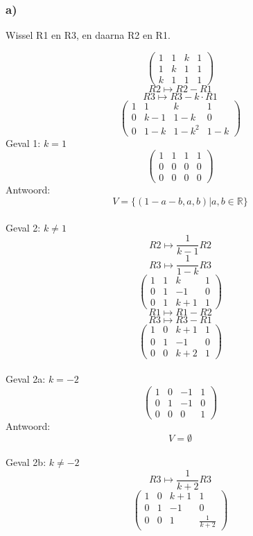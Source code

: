 \documentclass[10pt,a4paper]{article}
\begin{document}
\subsubsection*{a)}
\begin{center}
Wissel R1 en R3, en daarna R2 en R1.
\end{center}
\[
\begin{pmatrix}
1 &  1 &  k & 1\\
1 &  k &  1 & 1\\
k &  1 &  1 & 1
\end{pmatrix}
\]
\[ R2 \longmapsto R2 - R1\]
\[ R3 \longmapsto R3 - k \cdot	R1\]
\[
\begin{pmatrix}
1 &  1 &  k & 1\\
0 & k-1& 1-k& 0\\
0 & 1-k & 1-k^2 & 1-k
\end{pmatrix}
\]
Geval 1: $k=1$
\[
\begin{pmatrix}
1 &  1 & 1 & 1\\
0 &  0 & 0 & 0\\
0 &  0 & 0 & 0
\end{pmatrix}
\]
Antwoord:
\[
V=\{ (1-a-b,a,b) | a,b \in \mathbb{R}\}
\]\\
Geval 2: $k\neq 1$\\ 
\[ R2 \longmapsto \frac{1}{k-1}R2\]
\[ R3 \longmapsto \frac{1}{1-k}R3\]
\[
\begin{pmatrix}
1 &  1 &  k & 1\\
0 &  1 & -1 & 0\\
0 &  1 & k+1& 1
\end{pmatrix}
\]
\[ R1 \longmapsto R1-R2\]
\[ R3 \longmapsto R3-R1\]
\[
\begin{pmatrix}
1 &  0 &  k+1 & 1\\
0 &  1 & -1 & 0\\
0 &  0 & k+2& 1
\end{pmatrix}
\]\\
Geval 2a: $k = -2$\\
\[
\begin{pmatrix}
1 &  0 & -1 & 1\\
0 &  1 & -1 & 0\\
0 &  0 &  0 & 1
\end{pmatrix}
\]
Antwoord:
\[
V=\emptyset
\]\\
Geval 2b: $k\neq-2$\\
\[ R3 \longmapsto \frac{1}{k+2}R3\]
\[
\begin{pmatrix}
1 &  0 &  k+1 & 1\\
0 &  1 & -1 & 0\\
0 &  0 &  1 & \frac{1}{k+2}
\end{pmatrix}
\]
\end{document}
